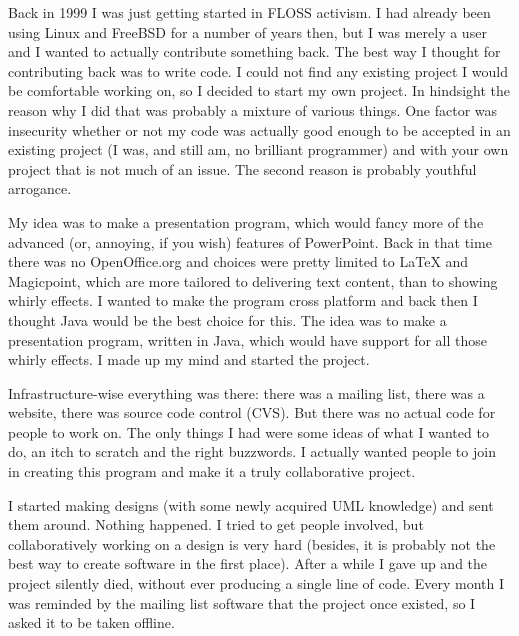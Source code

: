 

\noindent{}Back in 1999 I was just getting started in FLOSS activism. I had already
been using Linux and FreeBSD for a number of years then, but I was merely a user and
I wanted to actually contribute something back. The best way I thought for
contributing back was to write code. I could not find any existing project I
would be comfortable working on, so I decided to start my own project. In
hindsight the reason why I did that was probably a mixture of various things.
One factor was insecurity whether or not my code was actually good enough to be
accepted in an existing project (I was, and still am, no brilliant programmer)
and with your own project that is not much of an issue. The second reason is
probably youthful arrogance.

My idea was to make a presentation program, which would fancy more of the
advanced (or, annoying, if you wish) features of PowerPoint. Back in that time
there was no OpenOffice.org and choices were pretty limited to LaTeX and
Magicpoint, which are more tailored to delivering text content, than to showing
whirly effects. I wanted to make the program cross platform and back then I
thought Java would be the best choice for this. The idea was to make a
presentation program, written in Java, which would have support for all those
whirly effects. I made up my mind and started the project.

Infrastructure-wise everything was there: there was a mailing list, there was a
website, there was source code control (CVS). But there was no actual code for
people to work on. The only things I had were some ideas of what I wanted to do,
an itch to scratch and the right buzzwords. I actually wanted people to join in
creating this program and make it a truly collaborative project.

I started making designs (with some newly acquired UML knowledge) and sent them
around. Nothing happened. I tried to get people involved, but collaboratively
working on a design is very hard (besides, it is probably not the best way to
create software in the first place). After a while I gave up and the project
silently died, without ever producing a single line of code. Every month I was
reminded by the mailing list software that the project once existed, so I asked
it to be taken offline.

